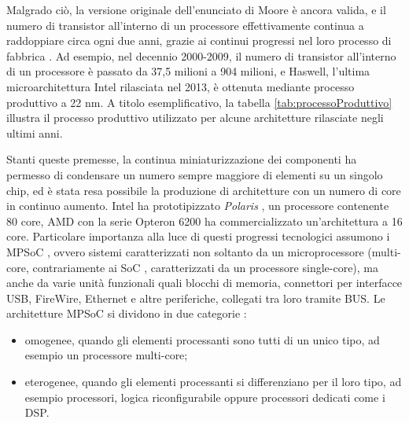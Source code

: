 Malgrado ci\`o, la versione originale dell'enunciato di Moore \`e ancora valida, e il numero di transistor
all'interno di un processore effettivamente continua a raddoppiare circa ogni due anni, grazie ai continui progressi
nel loro processo di fabbrica \cite{MooreLawPastPresentFuture}. Ad esempio, nel decennio 2000-2009, il numero di transistor all'interno di
un processore \`e passato da 37,5 milioni a 904 milioni, e Haswell, l'ultima microarchitettura Intel
rilasciata nel 2013, \`e ottenuta mediante processo produttivo a 22 nm.
A titolo esemplificativo, la tabella \ref{tab:processoProduttivo} illustra il processo produttivo utilizzato per
alcune architetture rilasciate negli ultimi anni.


Stanti queste premesse, la continua miniaturizzazione dei componenti ha permesso di condensare
un numero sempre maggiore di elementi su un singolo chip, ed \`e stata resa possibile la produzione di
architetture con un numero di core in continuo aumento. Intel ha prototipizzato \emph{Polaris} \cite{IntelPolaris},
un processore contenente 80 core, AMD con la serie Opteron\texttrademark{} 6200 ha commercializzato
un'architettura a 16 core.
Particolare importanza alla luce di questi progressi tecnologici assumono i \ac{MPSoC} \cite{MPSoCBook}, ovvero sistemi
caratterizzati non soltanto da un microprocessore (multi-core, contrariamente ai \ac{SoC} \cite{SoCBook}, caratterizzati
da un processore single-core), ma anche da varie unit\`a funzionali quali
blocchi di memoria, connettori per interfacce USB, FireWire, Ethernet e altre periferiche, collegati
tra loro tramite BUS. Le architetture \ac{MPSoC} si dividono in due categorie \cite{IntroMPSoCTrendsChallenges}:
\begin{itemize}
  \item omogenee, quando gli elementi processanti sono tutti di un unico tipo, ad esempio un processore
    multi-core;
  \item eterogenee, quando gli elementi processanti si differenziano per il loro tipo, ad esempio processori,
    logica riconfigurabile oppure processori dedicati come i \acs{DSP}.
\end{itemize}
 

